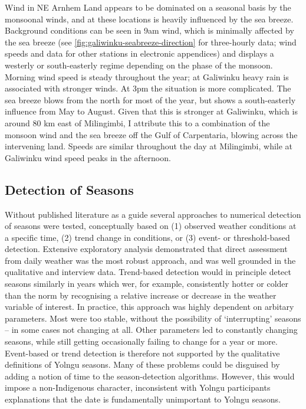 Wind in NE Arnhem Land appears to be dominated on a seasonal basis by the
monsoonal winds, and at these locations is heavily influenced by the sea
breeze.  Background conditions can be seen in 9am wind, which is minimally
affected by the sea breeze (see \cref{fig:galiwinku-seabreeze-direction}
for three-hourly data; wind speeds and data for other stations in electronic appendices)
and displays a westerly or south-easterly regime depending on the phase of the monsoon.
Morning wind speed is steady throughout the year; at Galiwinku heavy rain
is associated with stronger winds.
%
At 3pm the situation is more complicated.  The sea breeze blows from the north
for most of the year, but shows a south-easterly influence from May to
August.  Given that this is stronger at Galiwinku, which is around 80 km
east of Milingimbi, I attribute this to a combination of the monsoon wind
and the sea breeze off the Gulf of Carpentaria, blowing across the intervening
land.  Speeds are similar throughout the day at Milingimbi, while at Galiwinku
wind speed peaks in the afternoon.



\subsection{Detection of Seasons}
\label{subsec:disc-season-detection}

Without published literature as a guide several approaches to numerical
detection of seasons were tested, conceptually based on (1) observed weather conditions
at a specific time, (2) trend change in conditions, or (3) event- or threshold-based
detection.  Extensive exploratory analysis demonstrated that direct assessment
from daily weather was the most robust approach, and was well grounded in the
qualitative and interview data.
%
Trend-based detection would in principle detect seasons similarly in years
which wer, for example, consistently hotter or colder than the norm by recognising
a relative increase or decrease in the weather variable of interest.
In practice, this approach was highly dependent on arbitary parameters.
Most were too stable, without the possibility of `interrupting' seasons --
in some cases not changing at all.  Other parameters led to constantly
changing seasons, while still getting occasionally failing to change for a
year or more.  Event-based or trend detection is therefore not supported by
the qualitative definitions of Yolngu seasons.
%
Many of these problems could be disguised by adding a notion of time to the
season-detection algorithms.  However, this would impose a non-Indigenous
character, inconsistent with Yolngu participants explanations that the date
is fundamentally unimportant to Yolngu seasons.


